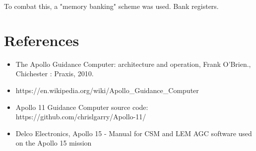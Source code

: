 \documentclass[a4paper,11pt]{article}
\begin{document}
To combat this, a "memory banking" scheme was used. Bank registers.


\section{References}

\begin{itemize}
  \item The Apollo Guidance Computer: architecture and operation, Frank O'Brien., Chichester : Praxis, 2010.
  \item https://en.wikipedia.org/wiki/Apollo\_Guidance\_Computer
  \item Apollo 11 Guidance Computer source code: https://github.com/chrislgarry/Apollo-11/
  \item Delco Electronics, Apollo 15 - Manual for CSM and LEM AGC software used on the Apollo 15 mission
\end{itemize}
\end{document}
